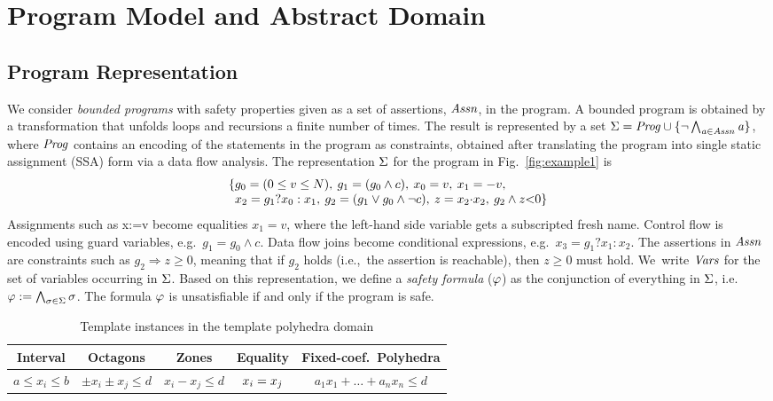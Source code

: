 \section{Program Model and Abstract Domain}\label{sec:domains}
\subsection{Program Representation}\label{sec:program}  
%
We consider \emph{bounded programs} with safety
properties given as a set of assertions, $\assertions$, in the program.
%
A bounded program is obtained by a transformation that unfolds
loops and recursions a finite number of times. The result 
is represented by a set
$\constraints=\program\cup\{\neg \bigwedge_{\assertion\in\assertions} \assertion\}$,
where $\program$ contains an encoding of the statements in the program as
constraints, obtained after translating the program
into single static assignment (SSA) form via a data flow analysis.
%
The representation $\constraints$ for the program in Fig.~\ref{fig:example1} is 
%
\begin{equation}\label{eq:ssa}
\begin{array}{l@{}l}
\{ & g_0 = (0 \leq v \leq N),\:
     g_1 = (g_0 \wedge c),\:
     x_0 = v,\:
     x_1 = -v, \\ 
  &  x_2 = g_1?x_0:x_1, \:
     g_2 = (g_1 \vee g_0\wedge \neg c), \:
     z  = x_2{\cdot}x_2,\:
     g_2 \wedge z{<}0 \}
\end{array}
\end{equation}
%
Assignments such as x:=v become equalities $x_1=v$, where the
left-hand side variable gets a subscripted fresh name.
%
Control flow is encoded using guard variables, e.g.~$g_1=g_0\wedge c$.
%
Data flow joins become conditional expressions, e.g.~$x_3=g_1?x_1:x_2$.
%
The assertions in $\assertions$ are constraints such as $g_2
\Rightarrow z\geq 0$, meaning that if $g_2$ holds
(i.e.,~the assertion is reachable), then $z \geq 0$ must hold.
%
We~write $\vars$ for the set of variables occurring in $\constraints$.  
Based on this representation, we define a \textit{safety formula}
($\formula$) as the conjunction of everything in $\constraints$, i.e.\
$\formula:= \bigwedge_{\constraint\in\constraints} \constraint$. The formula 
$\formula$ is unsatisfiable if and only if the program is safe.
%
\begin{table}[t]
\small
\begin{center}
{
\begin{tabular}{c@{\quad}|@{\quad}c@{\quad}|@{\quad}c@{\quad}|@{\quad}c@{\quad}|@{\quad}c}
Interval & Octagons & Zones & Equality & Fixed-coef.~Polyhedra \\ \hline
$a \leq x_i \leq b$ & $\pm x_i \pm x_j \leq d$ & $x_i - x_j \leq d$ & 
  $x_i=x_j\Omit{,(x_i \neq x_j)}$ & $a_1x_1 + \ldots + a_nx_n \leq d$
\end{tabular}
}
\end{center}
\caption{Template instances in the template polyhedra domain}
\label{domain}
\end{table}
%
